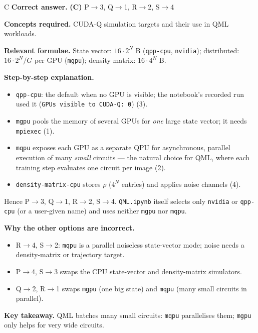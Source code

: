 \documentclass[11pt,a4paper]{article}
\newcommand{\qsep}{\par\vspace{2pt}{\color{black!15}\hrule}\vspace{4pt}}
\begin{document}
\begin{solbox}{C}
\textbf{\color{brand}Correct answer.} \textcolor{okgreen}{\textbf{(C)}} P$\to$3, Q$\to$1, R$\to$2, S$\to$4

\textbf{\color{brand}Concepts required.} CUDA-Q simulation targets and their use in QML workloads.

\textbf{\color{brand}Relevant formulae.} State vector: $16\cdot2^N$ B (\texttt{qpp-cpu}, \texttt{nvidia}); distributed: $16\cdot2^N/G$ per GPU (\texttt{mgpu}); density matrix: $16\cdot4^N$ B.

\textbf{\color{brand}Step-by-step explanation.} \begin{itemize}\itemsep0pt
\item \texttt{qpp-cpu}: the default when no GPU is visible; the notebook's recorded run used it (\texttt{GPUs visible to CUDA-Q: 0}) (3).
\item \texttt{mgpu} pools the memory of several GPUs for \emph{one} large state vector; it needs \texttt{mpiexec} (1).
\item \texttt{mqpu} exposes each GPU as a separate QPU for asynchronous, parallel execution of many \emph{small} circuits --- the natural
choice for QML, where each training step evaluates one circuit per image (2).
\item \texttt{density-matrix-cpu} stores $\rho$ ($4^N$ entries) and applies noise channels (4).
\end{itemize}
Hence P$\to$3, Q$\to$1, R$\to$2, S$\to$4. \texttt{QML.ipynb} itself selects only \texttt{nvidia} or \texttt{qpp-cpu} (or a user-given name) and uses neither \texttt{mgpu} nor \texttt{mqpu}.

\textbf{\color{brand}Why the other options are incorrect.}
\begin{itemize}[leftmargin=2.4em, itemsep=1pt, topsep=2pt]
\item[\textbf{(A)}] R$\to$4, S$\to$2: \texttt{mqpu} is a parallel noiseless state-vector mode; noise needs a density-matrix or trajectory target.
\item[\textbf{(B)}] P$\to$4, S$\to$3 swaps the CPU state-vector and density-matrix simulators.
\item[\textbf{(D)}] Q$\to$2, R$\to$1 swaps \texttt{mgpu} (one big state) and \texttt{mqpu} (many small circuits in parallel).
\end{itemize}
\textbf{\color{brand}Key takeaway.} QML batches many small circuits: \texttt{mqpu} parallelises them; \texttt{mgpu} only helps for very wide circuits.
\end{solbox}
\qsep
\end{document}
